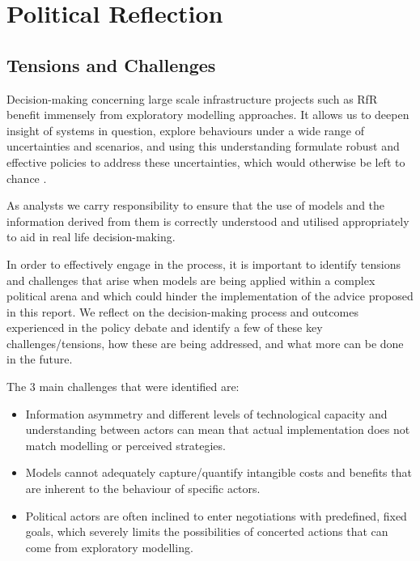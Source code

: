 \section{Political Reflection}
\label{s:poli_reflect}

\subsection{Tensions and Challenges}

Decision-making concerning large scale infrastructure projects such as RfR benefit immensely from exploratory modelling approaches. It allows us to deepen insight of systems in question, explore behaviours under a wide range of uncertainties and scenarios, and using this understanding formulate robust and effective policies to address these uncertainties, which would otherwise be left to chance \parencite{bankes_exploratory_1993}. %

As analysts we carry responsibility to ensure that the use of models and the information derived from them is correctly understood and utilised appropriately to aid in real life decision-making. 

In order to effectively engage in the process, it is important to identify tensions and challenges that arise when models are being applied within a complex political arena and which could hinder the implementation of the advice proposed in this report. We reflect on the decision-making process and outcomes experienced in the policy debate and identify a few of these key challenges/tensions, how these are being addressed, and what more can be done in the future.

The 3 main challenges that were identified are:

\begin{itemize}
    \item Information asymmetry and different levels of technological capacity and understanding between actors can mean that actual implementation does not match modelling or perceived strategies.
    \item Models cannot adequately capture/quantify intangible costs and benefits that are inherent to the behaviour of specific actors.
    \item Political actors are often inclined to enter negotiations with predefined, fixed goals, which severely limits the possibilities of concerted actions that can come from exploratory modelling.
\end{itemize}

